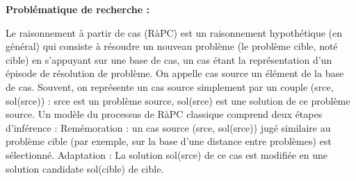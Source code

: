\documentclass{article}
\begin{document}
{\bfseries Probl\'ematique de recherche : }
\newline
\vspace*{2mm}

Le raisonnement \`{a} partir de cas (R\`{a}PC) est un raisonnement hypoth\'etique (en g\'en\'eral) qui consiste \`{a} r\'esoudre un nouveau probl\`{e}me (le probl\`{e}me cible, not\'e cible) en s'appuyant sur une base de cas, un cas \'etant la repr\'esentation d'un \'episode de r\'esolution de probl\`{e}me. On appelle cas source un \'el\'ement de la base de cas. Souvent, on repr\'esente un cas source simplement par un couple (srce, sol(srce)) : srce est un probl\`{e}me source, sol(srce) est une solution de ce probl\`{e}me source. Un mod\`{e}le du processus de R\`{a}PC classique comprend deux \'etapes d'inf\'erence : 
Rem\'emoration : un cas source (srce, sol(srce)) jug\'e similaire au probl\`{e}me cible (par exemple, sur la base d'une distance entre probl\`{e}mes) est s\'electionn\'e. 
Adaptation : La solution sol(srce) de ce cas est modifi\'ee en une solution candidate sol(cible) de cible. 
\end{document}
